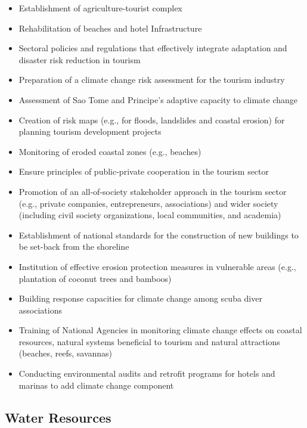 \documentclass[
]{book}
\providecommand{\tightlist}{%
  \setlength{\itemsep}{0pt}\setlength{\parskip}{0pt}}
\begin{document}
\begin{itemize}
\tightlist
\item
  Establishment of agriculture-tourist complex
\item
  Rehabilitation of beaches and hotel Infrastructure
\item
  Sectoral policies and regulations that effectively integrate adaptation and disaster risk reduction in tourism
\item
  Preparation of a climate change risk assessment for the tourism industry
\item
  Assessment of Sao Tome and Principe's adaptive capacity to climate change
\item
  Creation of risk maps (e.g., for floods, landslides and coastal erosion) for planning tourism development projects
\item
  Monitoring of eroded coastal zones (e.g., beaches)
\item
  Ensure principles of public-private cooperation in the tourism sector
\item
  Promotion of an all-of-society stakeholder approach in the tourism sector (e.g., private companies, entrepreneurs, associations) and wider society (including civil society organizations, local communities, and academia)
\item
  Establishment of national standards for the construction of new buildings to be set-back from the shoreline
\item
  Institution of effective erosion protection measures in vulnerable areas (e.g., plantation of coconut trees and bamboos)
\item
  Building response capacities for climate change among scuba diver associations
\item
  Training of National Agencies in monitoring climate change effects on coastal resources, natural systems beneficial to tourism and natural attractions (beaches, reefs, savannas)
\item
  Conducting environmental audits and retrofit programs for hotels and marinas to add climate change component
\end{itemize}

\hypertarget{water-resources-1}{%
\subsection{Water Resources}\label{water-resources-1}}
\end{document}

